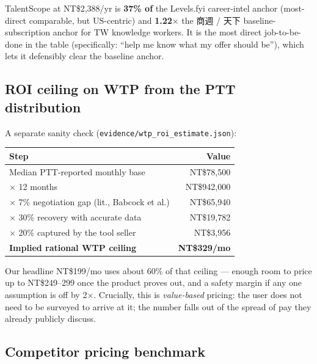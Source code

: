 \documentclass[11pt,a4paper]{article}
\begin{document}
TalentScope at NT\$2{,}388/yr is \textbf{37\% of} the Levels.fyi
career-intel anchor (most-direct comparable, but US-centric) and
\textbf{1.22$\times$} the 商週 / 天下 baseline-subscription anchor for
TW knowledge workers. It is the most direct job-to-be-done in the table
(specifically: ``help me know what my offer should be''), which lets it
defensibly clear the baseline anchor.

\subsection{ROI ceiling on WTP from the PTT distribution}

A separate sanity check (\texttt{evidence/wtp\_roi\_estimate.json}):

\begin{center}\small
\begin{tabular}{lr}
\toprule
\textbf{Step} & \textbf{Value} \\
\midrule
Median PTT-reported monthly base                & NT\$78,500 \\
$\times$ 12 months                              & NT\$942{,}000 \\
$\times$ 7\% negotiation gap (lit., Babcock et al.) & NT\$65{,}940 \\
$\times$ 30\% recovery with accurate data       & NT\$19{,}782 \\
$\times$ 20\% captured by the tool seller       & NT\$3{,}956 \\
\midrule
\textbf{Implied rational WTP ceiling} & \textbf{NT\$329/mo} \\
\bottomrule
\end{tabular}
\end{center}

Our headline NT\$199/mo uses about 60\% of that ceiling --- enough room
to price up to NT\$249--299 once the product proves out, and a safety
margin if any one assumption is off by 2$\times$. Crucially, this is
\emph{value-based} pricing: the user does not need to be surveyed to
arrive at it; the number falls out of the spread of pay they already
publicly discuss.

\subsection{Competitor pricing benchmark}
\end{document}
